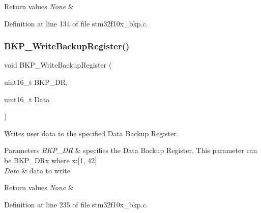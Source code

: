 \begin{DoxyRetVals}{Return values}
{\em None} & \\
\hline
\end{DoxyRetVals}


Definition at line 134 of file stm32f10x\+\_\+bkp.\+c.

\mbox{\label{group___b_k_p___private___functions_ga18d220387db651b3cb71fad5c092e041}} 
\subsubsection{\texorpdfstring{B\+K\+P\+\_\+\+Write\+Backup\+Register()}{BKP\_WriteBackupRegister()}}
{\footnotesize\ttfamily void B\+K\+P\+\_\+\+Write\+Backup\+Register (\begin{DoxyParamCaption}\item[{uint16\+\_\+t}]{B\+K\+P\+\_\+\+DR,  }\item[{uint16\+\_\+t}]{Data }\end{DoxyParamCaption})}



Writes user data to the specified Data Backup Register. 


\begin{DoxyParams}{Parameters}
{\em B\+K\+P\+\_\+\+DR} & specifies the Data Backup Register. This parameter can be B\+K\+P\+\_\+\+D\+Rx where x\+:\mbox{[}1, 42\mbox{]} \\
\hline
{\em Data} & data to write \\
\hline
\end{DoxyParams}

\begin{DoxyRetVals}{Return values}
{\em None} & \\
\hline
\end{DoxyRetVals}


Definition at line 235 of file stm32f10x\+\_\+bkp.\+c.

